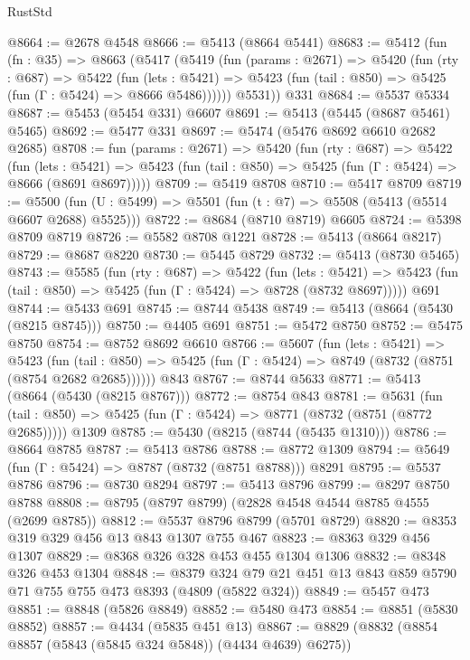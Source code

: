 \begin{lexlean}{RustStd}
\begin{coremodule}
@8664 := @2678 @4548
@8666 := @5413 (@8664 @5441)
@8683 := @5412
    (fun (fn : @35) =>
    @8663
      (@5417
        (@5419
          (fun (params : @2671) =>
          @5420
            (fun (rty : @687) =>
            @5422
              (fun (lets : @5421) =>
              @5423 (fun (tail : @850) => @5425 (fun (Γ : @5424) => @8666 @5486))))))
        @5531))
    @331
@8684 := @5537 @5334
@8687 := @5453 (@5454 @331) @6607
@8691 := @5413 (@5445 (@8687 @5461) @5465)
@8692 := @5477 @331
@8697 := @5474 (@5476 @8692 @6610 @2682 @2685)
@8708 := fun (params : @2671) =>
  @5420
    (fun (rty : @687) =>
    @5422
      (fun (lets : @5421) =>
      @5423 (fun (tail : @850) => @5425 (fun (Γ : @5424) => @8666 (@8691 @8697)))))
@8709 := @5419 @8708
@8710 := @5417 @8709
@8719 := @5500 (fun (U : @5499) => @5501 (fun (t : @7) => @5508 (@5413 (@5514 @6607 @2688) @5525)))
@8722 := @8684 (@8710 @8719) @6605
@8724 := @5398 @8709 @8719
@8726 := @5582 @8708 @1221
@8728 := @5413 (@8664 @8217)
@8729 := @8687 @8220
@8730 := @5445 @8729
@8732 := @5413 (@8730 @5465)
@8743 := @5585
    (fun (rty : @687) =>
    @5422
      (fun (lets : @5421) =>
      @5423 (fun (tail : @850) => @5425 (fun (Γ : @5424) => @8728 (@8732 @8697)))))
    @691
@8744 := @5433 @691
@8745 := @8744 @5438
@8749 := @5413 (@8664 (@5430 (@8215 @8745)))
@8750 := @4405 @691
@8751 := @5472 @8750
@8752 := @5475 @8750
@8754 := @8752 @8692 @6610
@8766 := @5607
    (fun (lets : @5421) =>
    @5423
      (fun (tail : @850) => @5425 (fun (Γ : @5424) => @8749 (@8732 (@8751 (@8754 @2682 @2685))))))
    @843
@8767 := @8744 @5633
@8771 := @5413 (@8664 (@5430 (@8215 @8767)))
@8772 := @8754 @843
@8781 := @5631
    (fun (tail : @850) => @5425 (fun (Γ : @5424) => @8771 (@8732 (@8751 (@8772 @2685)))))
    @1309
@8785 := @5430 (@8215 (@8744 (@5435 @1310)))
@8786 := @8664 @8785
@8787 := @5413 @8786
@8788 := @8772 @1309
@8794 := @5649 (fun (Γ : @5424) => @8787 (@8732 (@8751 @8788))) @8291
@8795 := @5537 @8786
@8796 := @8730 @8294
@8797 := @5413 @8796
@8799 := @8297 @8750 @8788
@8808 := @8795 (@8797 @8799) (@2828 @4548 @4544 @8785 @4555 (@2699 @8785))
@8812 := @5537 @8796 @8799 (@5701 @8729)
@8820 := @8353 @319 @329 @456 @13 @843 @1307 @755 @467
@8823 := @8363 @329 @456 @1307
@8829 := @8368 @326 @328 @453 @455 @1304 @1306
@8832 := @8348 @326 @453 @1304
@8848 := @8379 @324 @79 @21 @451 @13 @843 @859 @5790 @71 @755 @755 @473 @8393 (@4809 (@5822 @324))
@8849 := @5457 @473
@8851 := @8848 (@5826 @8849)
@8852 := @5480 @473
@8854 := @8851 (@5830 @8852)
@8857 := @4434 (@5835 @451 @13)
@8867 := @8829 (@8832 (@8854 @8857 (@5843 (@5845 @324 @5848)) (@4434 @4639) @6275))

\end{coremodule}
\end{lexlean}
